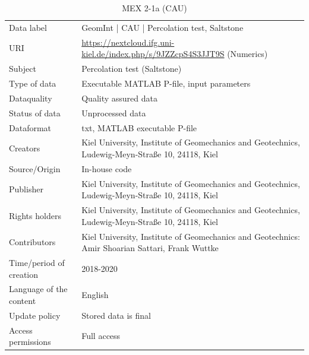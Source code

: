 \begin{table}[!ht]
\caption{MEX 2-1a (CAU)}
\label{tab:dms-mex2-1a-cau}
\small
\begin{tabular}{R{3.5cm}|L{7.5cm}}
\hline
%
Data label & GeomInt | CAU | Percolation test, Saltstone\\
URI &  \url{https://nextcloud.ifg.uni-kiel.de/index.php/s/9JZZcpS4S3JJT9S} (Numerics)
\\
Subject  &  Percolation test (Saltstone)\\
Type of data  & Executable MATLAB P-file, input parameters\\
Dataquality  &  Quality assured data \\
Status of data  &  Unprocessed data\\
Dataformat  & txt, MATLAB executable P-file\\
Creators  &  Kiel University, Institute of Geomechanics and Geotechnics, Ludewig-Meyn-Stra\ss e 10, 24118, Kiel\\
Source/Origin & In-house code \\
Publisher  &  Kiel University, Institute of Geomechanics and Geotechnics, Ludewig-Meyn-Stra\ss e 10, 24118, Kiel \\
Rights holders &  Kiel University, Institute of Geomechanics and Geotechnics, Ludewig-Meyn-Stra\ss e 10, 24118, Kiel \\
Contributors &   Kiel University, Institute of Geomechanics and Geotechnics: Amir Shoarian Sattari, Frank Wuttke\\
Time/period of creation &  2018-2020\\
Language of the content &  English\\
Update policy &  Stored data is final\\
Access permissions & Full access\\
%
\hline
\end{tabular}
\end{table}